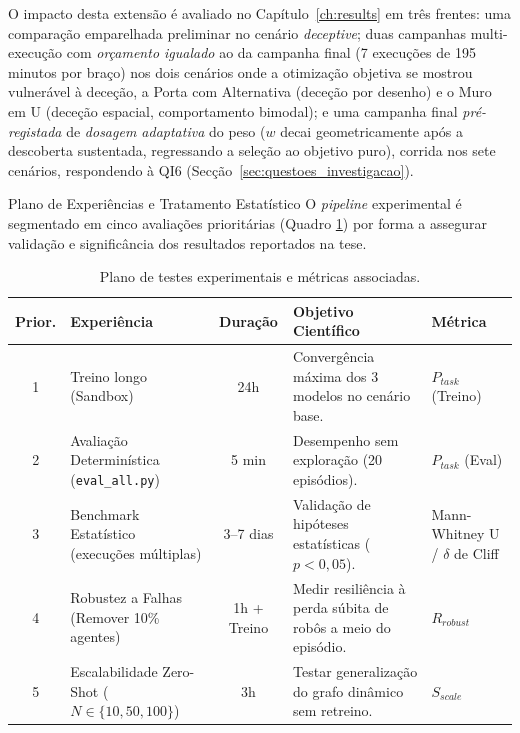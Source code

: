 \documentclass[12pt,reqno, twoside]{amsbook}
\makeatletter
\def\section{\@startsection{section}{1}%
      \z@{.5\linespacing\@plus.7\linespacing}{.25\linespacing}%
      {\normalfont\bfseries\flushleft}}
\theoremstyle{plain}
\numberwithin{equation}{chapter}
\numberwithin{section}{chapter}
\numberwithin{table}{chapter}
\numberwithin{figure}{chapter}
\makeatother
\begin{document}
O impacto desta extensão é avaliado no Capítulo~\ref{ch:results} em três frentes: uma comparação emparelhada preliminar no cenário \textit{deceptive}; duas campanhas multi-execução com \emph{orçamento igualado} ao da campanha final (7 execuções de 195 minutos por braço) nos dois cenários onde a otimização objetiva se mostrou vulnerável à deceção, a Porta com Alternativa (deceção por desenho) e o Muro em U (deceção espacial, comportamento bimodal); e uma campanha final \emph{pré-registada} de \emph{dosagem adaptativa} do peso ($w$ decai geometricamente após a descoberta sustentada, regressando a seleção ao objetivo puro), corrida nos sete cenários, respondendo à QI6 (Secção~\ref{sec:questoes_investigacao}).

\section{Plano de Experiências e Tratamento Estatístico}
O \textit{pipeline} experimental é segmentado em cinco avaliações prioritárias (Quadro \ref{tab:experiments_priority}) por forma a assegurar validação e significância dos resultados reportados na tese.

\begin{table}[!htbp]
\centering
\footnotesize
\caption[Plano de testes experimentais]{Plano de testes experimentais e métricas associadas.}
\label{tab:experiments_priority}
\renewcommand{\arraystretch}{1.2}
\begin{tabular}{|c|p{4cm}|c|p{3.5cm}|p{2cm}|}
\hline
\textbf{Prior.} & \textbf{Experiência} & \textbf{Duração} & \textbf{Objetivo Científico} & \textbf{Métrica} \\ \hline
1 & Treino longo (Sandbox) & 24h & Convergência máxima dos 3 modelos no cenário base. & $P_{task}$ (Treino) \\ \hline
2 & Avaliação Determinística (\texttt{eval\_all.py}) & 5 min & Desempenho sem exploração (20 episódios). & $P_{task}$ (Eval) \\ \hline
3 & Benchmark Estatístico (execuções múltiplas) & 3--7 dias & Validação de hipóteses estatísticas ($p < 0{,}05$). & Mann-Whitney U / $\delta$ de Cliff \\ \hline
4 & Robustez a Falhas (Remover 10\% agentes) & 1h + Treino & Medir resiliência à perda súbita de robôs a meio do episódio. & $R_{robust}$ \\ \hline
5 & Escalabilidade Zero-Shot ($N \in \{10, 50, 100\}$) & 3h & Testar generalização do grafo dinâmico sem retreino. & $S_{scale}$ \\ \hline
\end{tabular}
\end{table}
\end{document}

